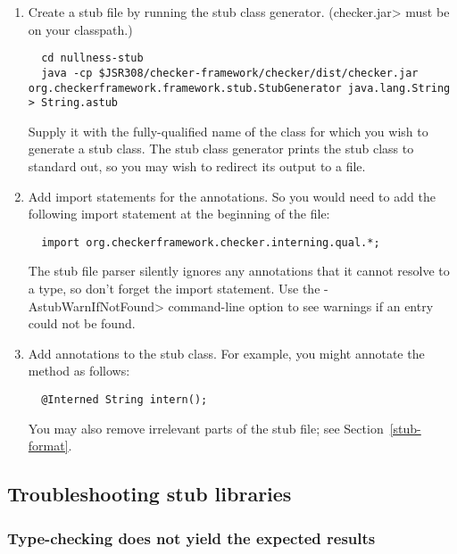 \begin{enumerate}

\item
  Create a stub file by running the stub class generator.  (\<checker.jar> must be on your classpath.)

\begin{Verbatim}
  cd nullness-stub
  java -cp $JSR308/checker-framework/checker/dist/checker.jar org.checkerframework.framework.stub.StubGenerator java.lang.String > String.astub
\end{Verbatim}

  Supply it with the fully-qualified name of the class for which you wish to
  generate a stub class.  The stub class generator prints the
  stub class to standard out, so you may wish to redirect its output to a
  file.

\item
  Add import statements for the annotations.  So you would need to
add the following import statement at the beginning of the file:

\begin{Verbatim}
  import org.checkerframework.checker.interning.qual.*;
\end{Verbatim}

\noindent
The stub file parser silently ignores any annotations that it cannot
resolve to a type, so don't forget the import statement.
Use the \<-AstubWarnIfNotFound> command-line option to see warnings
if an entry could not be found.

\item
  Add annotations to the stub class.  For example, you might annotate
  the  method as follows:

\begin{Verbatim}
  @Interned String intern();
\end{Verbatim}

  You may also remove irrelevant parts of the stub file; see
  Section~\ref{stub-format}.

\end{enumerate}


\subsection{Troubleshooting stub libraries\label{stub-troubleshooting}}


\subsubsection{Type-checking does not yield the expected results\label{stub-troubleshooting-type-checking-results}}

